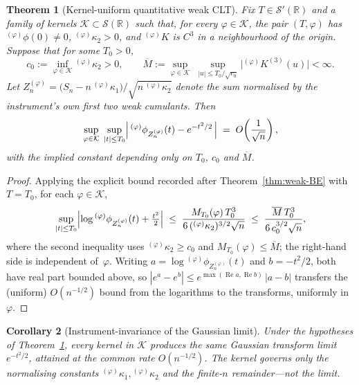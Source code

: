 \documentclass[12pt]{article}
\newtheorem{theorem}{Theorem}[section]
\newtheorem{corollary}[theorem]{Corollary}
\theoremstyle{definition}
\newcommand{\R}{\mathbb{R}}
\begin{document}
\begin{theorem}[Kernel-uniform quantitative weak CLT]
\label{thm:weak-BE-uniform}
Fix $T\in\mathcal{S}'(\R)$ and a family of kernels
$\mathcal{K}\subset\mathcal{S}(\R)$ such that, for every
$\varphi\in\mathcal{K}$, the pair $(T,\varphi)$ has
${}^{(\varphi)}\phi(0)\ne0$, ${}^{(\varphi)}\kappa_2>0$, and
${}^{(\varphi)}K$ is $C^3$ in a neighbourhood of the origin.  Suppose that for
some $T_0>0$,
\[
   c_0:=\inf_{\varphi\in\mathcal{K}}{}^{(\varphi)}\kappa_2>0,
   \qquad
   \overline{M}:=\sup_{\varphi\in\mathcal{K}}\;
   \sup_{|u|\le T_0/\sqrt{c_0}}
   \bigl|{}^{(\varphi)}K^{(3)}(u)\bigr|<\infty .
\]
Let $Z_n^{(\varphi)}=\bigl(S_n-n\,{}^{(\varphi)}\kappa_1\bigr)/
\sqrt{n\,{}^{(\varphi)}\kappa_2}$ denote the sum normalised by the
instrument's own first two weak cumulants.  Then
\[
   \sup_{\varphi\in\mathcal{K}}\;\sup_{|t|\le T_0}
   \Bigl|\,{}^{(\varphi)}\phi_{Z_n^{(\varphi)}}(t)-e^{-t^2/2}\,\Bigr|
   \;=\;O\!\left(\frac{1}{\sqrt n}\right),
\]
with the implied constant depending only on $T_0$, $c_0$ and $\overline{M}$.
\end{theorem}

\begin{proof}
Applying the explicit bound recorded after Theorem~\ref{thm:weak-BE} with
$T=T_0$, for each $\varphi\in\mathcal{K}$,
\[
   \sup_{|t|\le T_0}\Bigl|\log{}^{(\varphi)}\phi_{Z_n^{(\varphi)}}(t)
   +\tfrac{t^2}{2}\Bigr|
   \;\le\;\frac{M_{T_0}(\varphi)\,T_0^3}
   {6\,({}^{(\varphi)}\kappa_2)^{3/2}\sqrt n}
   \;\le\;\frac{\overline{M}\,T_0^3}{6\,c_0^{3/2}\sqrt n},
\]
where the second inequality uses ${}^{(\varphi)}\kappa_2\ge c_0$ and
$M_{T_0}(\varphi)\le\overline{M}$; the right-hand side is independent
of~$\varphi$.  Writing $a={}\log{}^{(\varphi)}\phi_{Z_n^{(\varphi)}}(t)$ and
$b=-t^2/2$, both have real part bounded above, so
$|e^{a}-e^{b}|\le e^{\max(\operatorname{Re}a,\operatorname{Re}b)}\,|a-b|$
transfers the (uniform) $O(n^{-1/2})$ bound from the logarithms to the
transforms, uniformly in~$\varphi$.
\end{proof}

\begin{corollary}[Instrument-invariance of the Gaussian limit]
\label{cor:instrument-invariance}
Under the hypotheses of Theorem~\ref{thm:weak-BE-uniform}, every kernel in
$\mathcal{K}$ produces the \emph{same} Gaussian transform limit
$e^{-t^2/2}$, attained at the common rate $O(n^{-1/2})$.  The kernel governs
only the normalising constants
${}^{(\varphi)}\kappa_1,{}^{(\varphi)}\kappa_2$ and the finite-$n$
remainder---not the limit.
\end{corollary}
\end{document}
